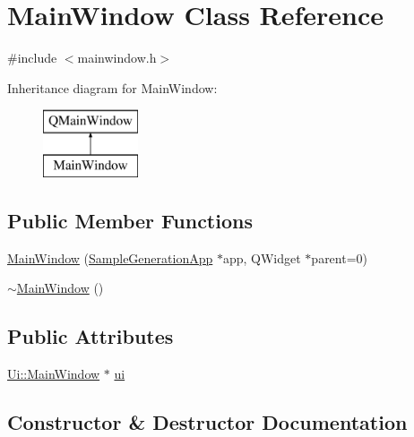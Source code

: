 \hypertarget{class_main_window}{}\section{Main\+Window Class Reference}
\label{class_main_window}


{\ttfamily \#include $<$mainwindow.\+h$>$}

Inheritance diagram for Main\+Window\+:\begin{figure}[H]
\begin{center}
\leavevmode
\includegraphics[height=2.000000cm]{class_main_window}
\end{center}
\end{figure}
\subsection*{Public Member Functions}
\begin{DoxyCompactItemize}
\item 
\hyperlink{class_main_window_a7fb1138e5c824a58606e94b08c7278af}{Main\+Window} (\hyperlink{class_sample_generation_app}{Sample\+Generation\+App} $\ast$app, Q\+Widget $\ast$parent=0)
\item 
\hyperlink{class_main_window_ae98d00a93bc118200eeef9f9bba1dba7}{$\sim$\+Main\+Window} ()
\end{DoxyCompactItemize}
\subsection*{Public Attributes}
\begin{DoxyCompactItemize}
\item 
\hyperlink{class_ui_1_1_main_window}{Ui\+::\+Main\+Window} $\ast$ \hyperlink{class_main_window_a35466a70ed47252a0191168126a352a5}{ui}
\end{DoxyCompactItemize}


\subsection{Constructor \& Destructor Documentation}
\mbox{\label{class_main_window_a7fb1138e5c824a58606e94b08c7278af}} 
